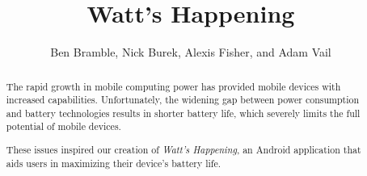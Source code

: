 \documentclass[11pt,pdftex,twocolumn]{article}
\title{Watt's Happening}
\author{Ben Bramble, Nick Burek, Alexis Fisher, and Adam Vail}
\begin{document}
\maketitle

\begin{abstract}
The rapid growth in mobile computing power has provided mobile devices with increased capabilities. 
Unfortunately, the widening gap between power consumption and battery technologies
results in shorter battery life, which severely limits the full potential of mobile devices.

These issues inspired our creation of \emph{Watt's Happening}, an Android application that aids users in maximizing their device's battery life.

\end{abstract}









{\footnotesize 
}
\end{document}
